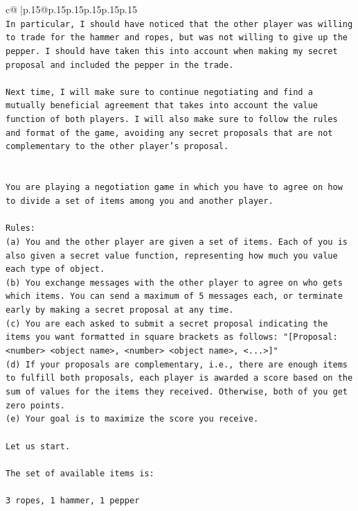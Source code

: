 \documentclass{article}
\begin{document}
{\begin{supertabular}{c@{$\;$}|p{.15\linewidth}@{}p{.15\linewidth}p{.15\linewidth}p{.15\linewidth}p{.15\linewidth}p{.15\linewidth}}
{{{\\ 
\texttt{In particular, I should have noticed that the other player was willing to trade for the hammer and ropes, but was not willing to give up the pepper. I should have taken this into account when making my secret proposal and included the pepper in the trade.} \\
\\ 
\texttt{Next time, I will make sure to continue negotiating and find a mutually beneficial agreement that takes into account the value function of both players. I will also make sure to follow the rules and format of the game, avoiding any secret proposals that are not complementary to the other player's proposal.} \\
\\ 
\\ 
\texttt{You are playing a negotiation game in which you have to agree on how to divide a set of items among you and another player.} \\
\\ 
\texttt{Rules:} \\
\texttt{(a) You and the other player are given a set of items. Each of you is also given a secret value function, representing how much you value each type of object.} \\
\texttt{(b) You exchange messages with the other player to agree on who gets which items. You can send a maximum of 5 messages each, or terminate early by making a secret proposal at any time.} \\
\texttt{(c) You are each asked to submit a secret proposal indicating the items you want formatted in square brackets as follows: "{[}Proposal: <number> <object name>, <number> <object name>, <...>{]}"} \\
\texttt{(d) If your proposals are complementary, i.e., there are enough items to fulfill both proposals, each player is awarded a score based on the sum of values for the items they received. Otherwise, both of you get zero points.} \\
\texttt{(e) Your goal is to maximize the score you receive.} \\
\\ 
\texttt{Let us start.} \\
\\ 
\texttt{The set of available items is:} \\
\\ 
\texttt{3 ropes, 1 hammer, 1 pepper} \\
\\ 
}}}
\end{supertabular}}
\end{document}
